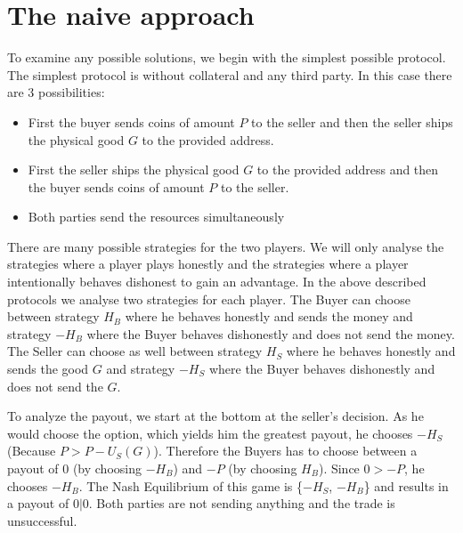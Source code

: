 \documentclass{cacthesis}
\begin{document}
\section{The naive approach}
To examine any possible solutions, we begin with the simplest possible protocol.\newline
The simplest protocol is without collateral and any third party. In this case there are 3 possibilities:
\begin{itemize}
	\item First the buyer sends coins of amount $P$ to the seller and then the seller ships the physical good $G$ to the provided address. 
	\item First the seller ships the physical good $G$ to the provided address and then the buyer sends coins of amount $P$ to the seller. 
	\item Both parties send the resources simultaneously
\end{itemize}


There are many possible strategies for the two players. We will only analyse the strategies where a player plays honestly and the strategies where a player intentionally behaves dishonest to gain an advantage.\newline
In the above described protocols we analyse two strategies for each player. The Buyer can choose between strategy $H_B$ where he behaves honestly and sends the money and strategy $-H_B$ where the Buyer behaves dishonestly and does not send the money. The Seller can choose as well between strategy $H_S$ where he behaves honestly and sends the good $G$ and strategy $-H_S$ where the Buyer behaves dishonestly and does not send the $G$.
\newline
To analyze the payout, we start at the bottom at the seller's decision. As he would choose the option, which yields him the greatest payout, he chooses $-H_S$ (Because $P > P - U_S(G)$).\newline
Therefore the Buyers has to choose between a payout of 0 (by choosing $-H_B$) and $-P$ (by choosing $H_B$). Since $0 > -P$, he chooses $-H_B$.\newline
The Nash Equilibrium of this game is \{$-H_S$, $-H_B$\} and results in a payout of $0|0$. Both parties are not sending anything and the trade is unsuccessful.
\end{document}
